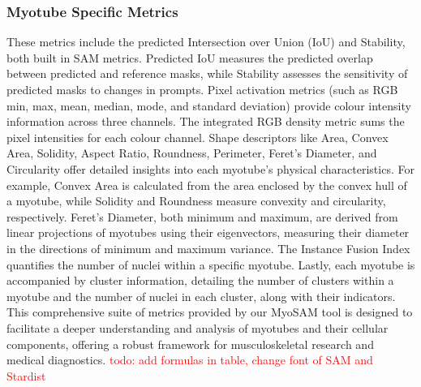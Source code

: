 \subsubsection{Myotube Specific Metrics}
These metrics include the predicted Intersection over Union (IoU) and Stability, both built in SAM metrics. Predicted IoU measures the predicted overlap between predicted and reference masks, while Stability assesses the sensitivity of predicted masks to changes in prompts. Pixel activation metrics (such as RGB min, max, mean, median, mode, and standard deviation) provide colour intensity information across three channels. The integrated RGB density metric sums the pixel intensities for each colour channel. Shape descriptors like Area, Convex Area, Solidity, Aspect Ratio, Roundness, Perimeter, Feret’s Diameter, and Circularity offer detailed insights into each myotube's physical characteristics. For example, Convex Area is calculated from the area enclosed by the convex hull of a myotube, while Solidity and Roundness measure convexity and circularity, respectively. Feret's Diameter, both minimum and maximum, are derived from linear projections of myotubes using their eigenvectors, measuring their diameter in the directions of minimum and maximum variance. The Instance Fusion Index quantifies the number of nuclei within a specific myotube. Lastly, each myotube is accompanied by cluster information, detailing the number of clusters within a myotube and the number of nuclei in each cluster, along with their indicators.
This comprehensive suite of metrics provided by our MyoSAM tool is designed to facilitate a deeper understanding and analysis of myotubes and their cellular components, offering a robust framework for musculoskeletal research and medical diagnostics.
\textcolor{red}{todo: add formulas in table, change font of SAM and Stardist}


